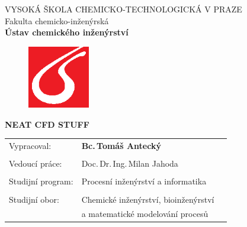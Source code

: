 \begin{center}
{\Large VYSOKÁ ŠKOLA CHEMICKO-TECHNOLOGICKÁ V PRAZE\\}
{\large Fakulta chemicko-inženýrská\\
\textbf{Ústav chemického inženýrství}\\}
\vspace{15mm}

\begin{figure}[!h]
\begin{center}
\includegraphics[angle=0,width=27mm]{images/logo_vscht.eps}
\end{center}
\end{figure}

\vspace{25mm}

{\Large \textbf{NEAT CFD STUFF\\}}
\end{center}
\vspace{35mm}


\begin{tabular}{p{50mm}lp{50mm}}
Vypracoval: & \textbf{Bc.\,Tomáš Antecký}\\
\\
Vedoucí práce: & Doc.\,Dr.\,Ing.\,Milan Jahoda \\

\\
Studijní program: & Procesní inženýrství a informatika \\
\\
Studijní obor: & Chemické inženýrství, bioinženýrství \\
	& a matematické modelování procesů\\
\end{tabular}
